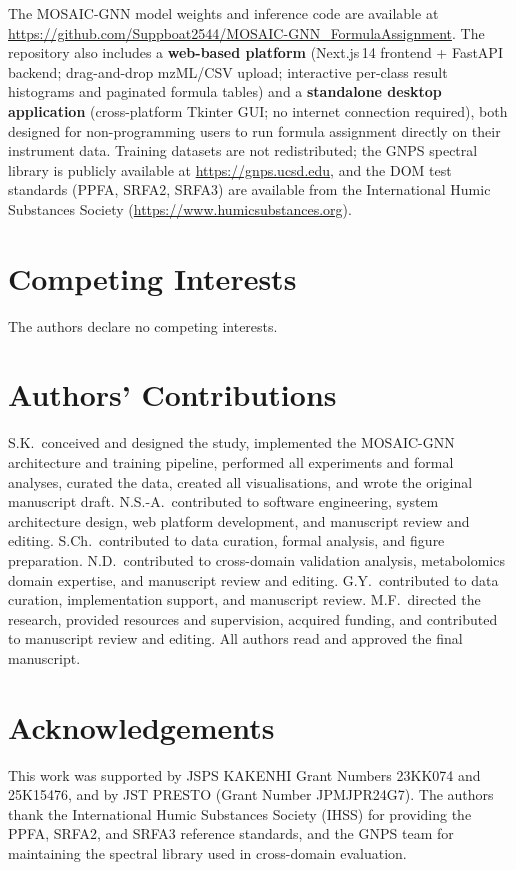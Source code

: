 \documentclass[journal=jcisd8]{achemso}
\begin{document}
The MOSAIC-GNN model weights and inference code are available at
\url{https://github.com/Suppboat2544/MOSAIC-GNN_FormulaAssignment}.
The repository also includes a \textbf{web-based platform} (Next.js\,14 frontend +
FastAPI backend; drag-and-drop mzML/CSV upload; interactive per-class result histograms
and paginated formula tables) and a \textbf{standalone desktop application}
(cross-platform Tkinter GUI; no internet connection required), both designed for
non-programming users to run formula assignment directly on their instrument data.
Training datasets are not redistributed; the GNPS spectral library is publicly available
at \url{https://gnps.ucsd.edu}, and the DOM test standards (PPFA, SRFA2, SRFA3) are
available from the International Humic Substances Society
(\url{https://www.humicsubstances.org}).

\section*{Competing Interests}

The authors declare no competing interests.

\section*{Authors' Contributions}

S.K.\ conceived and designed the study, implemented the MOSAIC-GNN architecture and training
pipeline, performed all experiments and formal analyses, curated the data, created all
visualisations, and wrote the original manuscript draft.
N.S.-A.\ contributed to software engineering, system architecture design, web platform development, and manuscript review and editing.
S.Ch.\ contributed to data curation, formal analysis, and figure preparation.
N.D.\ contributed to cross-domain validation analysis, metabolomics domain expertise,
and manuscript review and editing.
G.Y.\ contributed to data curation, implementation support, and manuscript review.
M.F.\ directed the research, provided resources and supervision, acquired funding, and
contributed to manuscript review and editing.
All authors read and approved the final manuscript.

\section*{Acknowledgements}

This work was supported by JSPS KAKENHI Grant Numbers 23KK074 and 25K15476, and by
JST PRESTO (Grant Number JPMJPR24G7).
The authors thank the International Humic Substances Society (IHSS) for providing the PPFA,
SRFA2, and SRFA3 reference standards, and the GNPS team for maintaining the spectral library
used in cross-domain evaluation.
\end{document}
